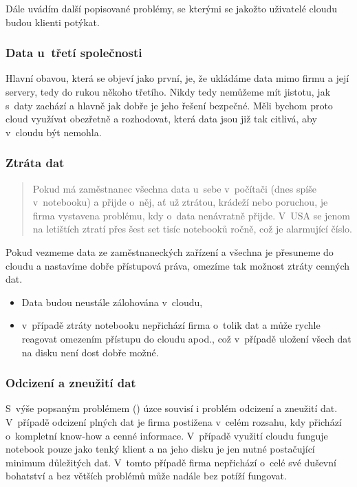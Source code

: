 Dále uvádím další popisované problémy, se kterými se jakožto uživatelé cloudu budou klienti potýkat.

\subsubsection{Data u~třetí společnosti}
Hlavní obavou, která se objeví jako první, je, že ukládáme data mimo firmu a její servery, tedy do rukou někoho třetího. Nikdy tedy nemůžeme mít jistotu, jak s~daty zachází a hlavně jak dobře je jeho řešení bezpečné. Měli bychom proto cloud využívat obezřetně a rozhodovat, která data jsou již tak citlivá, aby v~cloudu být nemohla.

\subsubsection{Ztráta dat}
\label{sec:ZtrataDat}
\begin{quote}
Pokud má zaměstnanec všechna data u~sebe v~počítači (dnes spíše v~notebooku) a přijde o~něj, ať už ztrátou, krádeží nebo poruchou, je firma vystavena problému, kdy o~data nenávratně přijde. V~USA se jenom na letištích ztratí přes šest set tisíc notebooků ročně, což je alarmující číslo.\cite{notebook:ztraceneNBnaLetistich}
\end{quote}

Pokud vezmeme data ze zaměstnaneckých zařízení a všechna je přesuneme do cloudu a nastavíme dobře přístupová práva, omezíme tak možnost ztráty cenných dat.
\begin{itemize}
	\item Data budou neustále zálohována v~cloudu,
	\item v~případě ztráty notebooku nepřichází firma o~tolik dat a může rychle reagovat omezením přístupu do cloudu apod., což v~případě uložení všech dat na disku není dost dobře možné.
\end{itemize}

\subsubsection{Odcizení a zneužití dat}
S~výše popsaným problémem () úzce souvisí i problém odcizení a zneužití dat. V~případě odcizení plných dat je firma postižena v~celém rozsahu, kdy přichází o~kompletní know-how a cenné informace. V~případě využití cloudu funguje notebook pouze jako tenký klient a na jeho disku je jen nutné postačující minimum důležitých dat. V~tomto případě firma nepřichází o~celé své duševní bohatství a bez větších problémů může nadále bez potíží fungovat.

